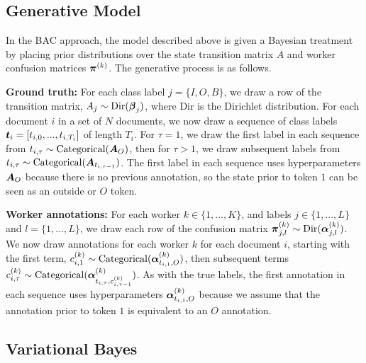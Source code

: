 \subsection{Generative Model}

In the BAC approach, the model described above is given a Bayesian treatment by placing prior distributions over the state transition matrix $A$ and worker confusion matrices $\boldsymbol\pi^{(k)}$. The generative process is as follows. 

\textbf{Ground truth:} For each class label $j=\{I, O, B\}$, we draw a row of the transition matrix, $A_j \sim \mathrm{Dir}(\boldsymbol\beta_j)$, where $\mathrm{Dir}$ is the Dirichlet distribution. 
For each document $i$ in a set of $N$ documents, we now draw a sequence of class labels $\boldsymbol t_i = [t_{i,0}, ..., t_{i, T_i}]$ of length $T_i$. For $\tau=1$, we draw the first label in each sequence from 
$t_{i,\tau} \sim \mathrm{Categorical}(\boldsymbol A_{O})$, 
then for $\tau > 1$, we draw subsequent labels from $t_{i,\tau} \sim \mathrm{Categorical}(\boldsymbol A_{t_{i,\tau-1}})$. The first label in each sequence uses hyperparameters $\boldsymbol A_{O}$ because there is no previous annotation, so the state prior to token $1$ can be seen as an outside or $O$ token. 

\textbf{Worker annotations:} For each worker $k\in\{1,...,K\}$, and labels $j\in\{1,...,L\}$ and $l=\{1,...,L\}$, we draw each row of the confusion matrix $\boldsymbol\pi_{j,l}^{(k)} \sim \mathrm{Dir}(\boldsymbol\alpha^{(k)}_{j,l})$. We now draw annotations for each worker $k$ for each document $i$, starting with the first term, $c_{i,1}^{(k)} \sim \mathrm{Categorical}( \boldsymbol\alpha^{(k)}_{t_{i,1}, O} )$, then subsequent terms $c_{i,\tau}^{(k)} \sim \mathrm{Categorical}( \boldsymbol\alpha^{(k)}_{t_{i,\tau}, c_{i,\tau-1}^{(k)}} )$. As with the true labels, the first annotation in each sequence uses hyperparameters $\boldsymbol\alpha^{(k)}_{t_{i,1}, O}$ because we assume that the annotation prior to token $1$ is equivalent to an $O$ annotation. 

\subsection{Variational Bayes}

